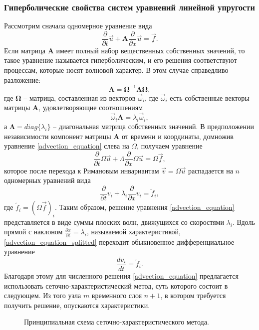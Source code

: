 \subsubsection{Гиперболические свойства систем уравнений линейной упругости}
\label{hyperbolic}
Рассмотрим сначала одномерное уравнение вида
\begin{equation}
\frac{\partial}{\partial{t}}\vec{u}+\mathbf{A}\frac{\partial}{\partial{x}}\vec{u}=\vec{f}.
\label{advection_equation}
\end{equation}
Если матрица $\mathbf{A}$ имеет полный набор вещественных собственных значений, 
то такое уравнение называется гиперболическим, и его решения соответствуют 
процессам, которые носят волновой характер. В этом случае справедливо разложение:
$$\mathbf{A}=\mathbf\Omega^{-1}\mathbf\Lambda\mathbf\Omega,$$
где $\mathbf\Omega$ -- матрица, составленная из векторов ${\vec\omega_i}$, где
$\vec\omega_i$ есть собственные векторы матрицы $\mathbf A$,
удовлетворяющие соотношениям
$$\vec\omega_i\mathbf A=\lambda_i\vec\omega_i,$$
а $\mathbf\Lambda=diag\{\lambda_i\}$ -- диагональная матрица собственных
значений.
В предположении независимости компонент матрицы $\mathbf{A}$ от времени и координаты, домножив уравнение \ref{advection_equation} слева на $\Omega$, получаем
уравнение
$$\frac{\partial}{\partial t}\Omega{\vec u}+
\Lambda\frac{\partial}{\partial x}\Omega{\vec u}=\Omega{\vec f},$$
которое после перехода к Римановым инвариантам ${\vec v}=\Omega{\vec u}$
распадается на $n$ одномерных уравнений вида
\begin{equation}
\frac{\partial}{\partial t}{v_i}+\lambda_i\frac{\partial}{\partial
x}{v_i}={{\tilde f}_i},
\label{advection_equation_splitted}
\end{equation}
где ${{\tilde f}_i}=(\Omega{\vec f})_i$.
Таким образом, решение уравнения \ref{advection_equation} представляется в виде
суммы плоских волн, движущихся со скоростями $\lambda_i$. Вдоль прямой с наклоном 
$\frac{\partial x}{\partial t} = \lambda_i$, называемой характеристикой, \ref{advection_equation_splitted} переходит обыкновенное дифференциальное уравнение 
\begin{equation}
\frac{d{v_i}}{dt} = {{\tilde f}_i}.
\label{advection_equation_final} 
\end{equation}
Благодаря этому для численного решения \ref{advection_equation} предлагается использовать сеточно-характеристический метод, суть которого состоит в следующем. Из того узла $m$ временного слоя $n+1$, в котором требуется получить решение, опускаются характеристики.
\begin{figure}[h]
\caption{Принципиальная схема сеточно-характеристического метода.}
\end{figure}
